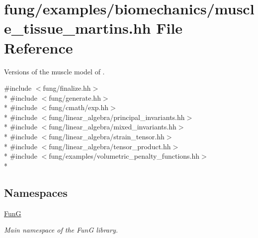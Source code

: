\hypertarget{muscle__tissue__martins_8hh}{\section{fung/examples/biomechanics/muscle\-\_\-tissue\-\_\-martins.hh File Reference}
\label{muscle__tissue__martins_8hh}
}


Versions of the muscle model of \cite{Martins1998}.  


{\ttfamily \#include $<$fung/finalize.\-hh$>$}\\*
{\ttfamily \#include $<$fung/generate.\-hh$>$}\\*
{\ttfamily \#include $<$fung/cmath/exp.\-hh$>$}\\*
{\ttfamily \#include $<$fung/linear\-\_\-algebra/principal\-\_\-invariants.\-hh$>$}\\*
{\ttfamily \#include $<$fung/linear\-\_\-algebra/mixed\-\_\-invariants.\-hh$>$}\\*
{\ttfamily \#include $<$fung/linear\-\_\-algebra/strain\-\_\-tensor.\-hh$>$}\\*
{\ttfamily \#include $<$fung/linear\-\_\-algebra/tensor\-\_\-product.\-hh$>$}\\*
{\ttfamily \#include $<$fung/examples/volumetric\-\_\-penalty\-\_\-functions.\-hh$>$}\\*
\subsection*{Namespaces}
\begin{DoxyCompactItemize}
\item 
\hyperlink{namespaceFunG}{Fun\-G}
\begin{DoxyCompactList}\small\item\em Main namespace of the Fun\-G library. \end{DoxyCompactList}\end{DoxyCompactItemize}
